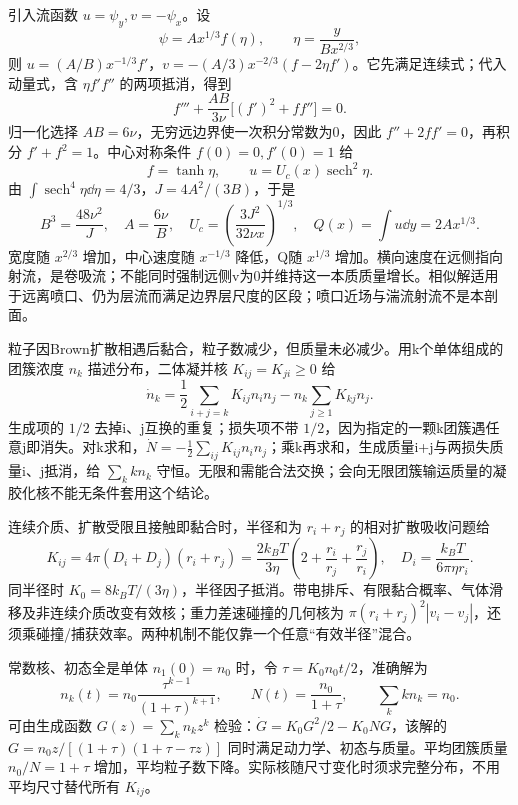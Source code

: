 引入流函数 $u=\psi_y,v=-\psi_x$。设
\[
 \psi=A x^{1/3}f(\eta),\qquad \eta=\frac{y}{B x^{2/3}},
\]
则 $u=(A/B)x^{-1/3}f'$，$v=-(A/3)x^{-2/3}(f-2\eta f')$。它先满足连续式；代入动量式，含 $\eta f'f''$ 的两项抵消，得到
\[
 f'''+\frac{AB}{3\nu}\bigl[(f')^2+ff''\bigr]=0.
\]
归一化选择 $AB=6\nu$，无穷远边界使一次积分常数为0，因此 $f''+2ff'=0$，再积分 $f'+f^2=1$。中心对称条件 $f(0)=0,f'(0)=1$ 给
\[
 f=\tanh\eta,\qquad u=U_c(x)\operatorname{sech}^2\eta.
\]
由 $\int\operatorname{sech}^4\eta\dd\eta=4/3$，$J=4A^2/(3B)$，于是
\[
 B^3=\frac{48\nu^2}{J},\quad A=\frac{6\nu}{B},\quad
 U_c=\left(\frac{3J^2}{32\nu x}\right)^{1/3},\quad
 Q(x)=\int u\dd y=2Ax^{1/3}.
\]
宽度随 $x^{2/3}$ 增加，中心速度随 $x^{-1/3}$ 降低，Q随 $x^{1/3}$ 增加。横向速度在远侧指向射流，是卷吸流；不能同时强制远侧v为0并维持这一本质质量增长。相似解适用于远离喷口、仍为层流而满足边界层尺度的区段；喷口近场与湍流射流不是本剖面。
\begin{center}\end{center}

粒子因Brown扩散相遇后黏合，粒子数减少，但质量未必减少。用k个单体组成的团簇浓度 $n_k$ 描述分布，二体凝并核 $K_{ij}=K_{ji}\ge0$ 给
\[
 \dot n_k=\frac12\sum_{i+j=k}K_{ij}n_in_j-n_k\sum_{j\ge1}K_{kj}n_j.
\]
生成项的 $1/2$ 去掉i、j互换的重复；损失项不带 $1/2$，因为指定的一颗k团簇遇任意j即消失。对k求和，$\dot N=-\frac12\sum_{ij}K_{ij}n_in_j$；乘k再求和，生成质量i+j与两损失质量i、j抵消，给 $\sum_kkn_k$ 守恒。无限和需能合法交换；会向无限团簇输运质量的凝胶化核不能无条件套用这个结论。

连续介质、扩散受限且接触即黏合时，半径和为 $r_i+r_j$ 的相对扩散吸收问题给
\[
 K_{ij}=4\pi(D_i+D_j)(r_i+r_j)
 =\frac{2k_BT}{3\eta}\left(2+\frac{r_i}{r_j}+\frac{r_j}{r_i}\right),
 \quad D_i=\frac{k_BT}{6\pi\eta r_i}.
\]
同半径时 $K_0=8k_BT/(3\eta)$，半径因子抵消。带电排斥、有限黏合概率、气体滑移及非连续介质改变有效核；重力差速碰撞的几何核为 $\pi(r_i+r_j)^2|v_i-v_j|$，还须乘碰撞/捕获效率。两种机制不能仅靠一个任意“有效半径”混合。

常数核、初态全是单体 $n_1(0)=n_0$ 时，令 $\tau=K_0n_0t/2$，准确解为
\[
 n_k(t)=n_0\frac{\tau^{k-1}}{(1+\tau)^{k+1}},\qquad
 N(t)=\frac{n_0}{1+\tau},\qquad \sum_kkn_k=n_0.
\]
可由生成函数 $G(z)=\sum_kn_kz^k$ 检验：$\dot G=K_0G^2/2-K_0NG$，该解的 $G=n_0z/[(1+\tau)(1+\tau-\tau z)]$ 同时满足动力学、初态与质量。平均团簇质量 $n_0/N=1+\tau$ 增加，平均粒子数下降。实际核随尺寸变化时须求完整分布，不用平均尺寸替代所有 $K_{ij}$。

